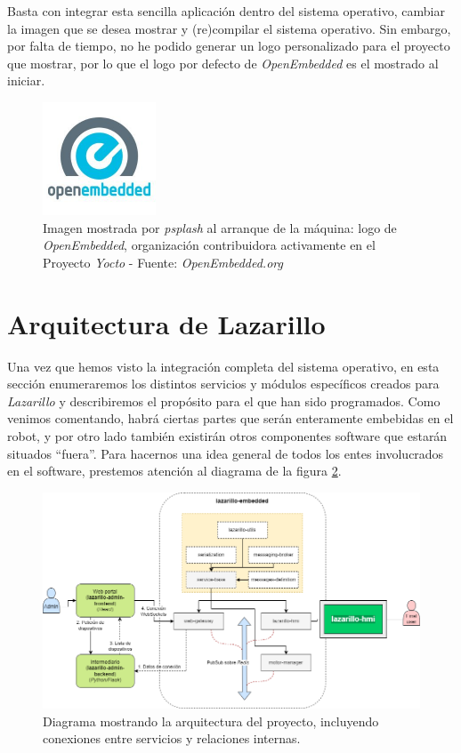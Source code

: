 Basta con integrar esta sencilla aplicación dentro del sistema operativo, cambiar la imagen que se desea mostrar y (re)compilar el sistema operativo. Sin embargo, por falta de tiempo, no he podido generar un logo personalizado para el proyecto que mostrar, por lo que el logo por defecto de \textit{OpenEmbedded} es el mostrado al iniciar.\\

\begin{figure}[h]
	\centering
	\includegraphics[width=0.3\textwidth]{imagenes/openembedded.jpg}
	\caption{Imagen mostrada por \textit{psplash} al arranque de la máquina: logo de \textit{OpenEmbedded}, organización contribuidora activamente en el Proyecto \textit{Yocto} - Fuente: \textit{OpenEmbedded.org} \cite{openembedded}}
	\label{openembedded}
\end{figure}


\section{Arquitectura de Lazarillo}

Una vez que hemos visto la integración completa del sistema operativo, en esta sección enumeraremos los distintos servicios y módulos específicos creados para \textit{Lazarillo} y describiremos el propósito para el que han sido programados. Como venimos comentando, habrá ciertas partes que serán enteramente embebidas en el robot, y por otro lado también existirán otros componentes software que estarán situados ``fuera''. Para hacernos una idea general de todos los entes involucrados en el software, prestemos atención al diagrama de la figura \ref{lazarillo-architecture}.\\

\begin{figure}[h]
	\centering
	\includegraphics[width=\textwidth]{imagenes/lazarillo-architecture.png}
	\caption{Diagrama mostrando la arquitectura del proyecto, incluyendo conexiones entre servicios y relaciones internas.}
	\label{lazarillo-architecture}
\end{figure}

